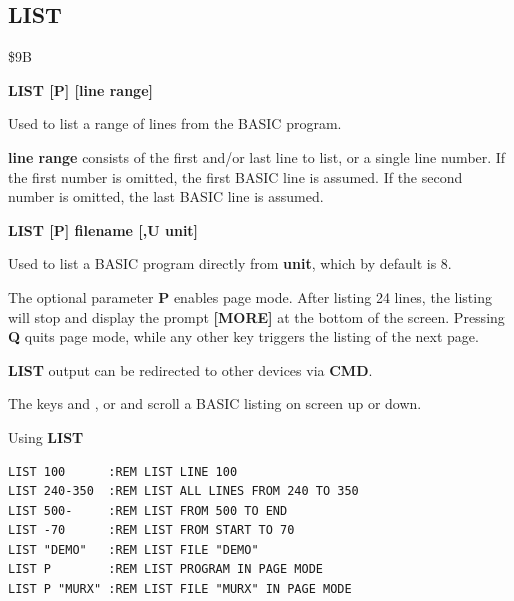 \newpage
\subsection{LIST}
\begin{description}[leftmargin=2cm,style=nextline]
\item [Token:] \$9B
\item [Format:] {\bf LIST [P] [line range]}

\item [Usage:] Used to list a range of lines from the BASIC program.

               {\bf line range} consists of the first and/or last
               line to list, or a single line number.
               If the first number is omitted, the
               first BASIC line is assumed.
               If the second number is omitted, the last BASIC line
               is assumed.

\item [Format:] {\bf LIST [P] filename [,U unit]}

               Used to list a BASIC program directly from {\bf unit},
               which by default is 8.

\item [Remarks:]

                The optional parameter {\bf P} enables page mode.
                After listing 24 lines, the listing will stop and display
                the prompt {\bf [MORE]} at the bottom of the screen.
                Pressing {\bf Q} quits page mode, while any other key
                triggers the listing of the next page.

                {\bf LIST} output can be redirected
                to other devices via {\bf CMD}.

                The keys  and , or
                   and
                  
                scroll a BASIC listing on screen up or down.

\item [Examples:] Using {\bf LIST}
\begin{tcolorbox}[colback=black,coltext=white]
\verbatimfont{\codefont}
\begin{verbatim}
LIST 100      :REM LIST LINE 100
LIST 240-350  :REM LIST ALL LINES FROM 240 TO 350
LIST 500-     :REM LIST FROM 500 TO END
LIST -70      :REM LIST FROM START TO 70
LIST "DEMO"   :REM LIST FILE "DEMO"
LIST P        :REM LIST PROGRAM IN PAGE MODE
LIST P "MURX" :REM LIST FILE "MURX" IN PAGE MODE
\end{verbatim}
\end{tcolorbox}
\end{description}

